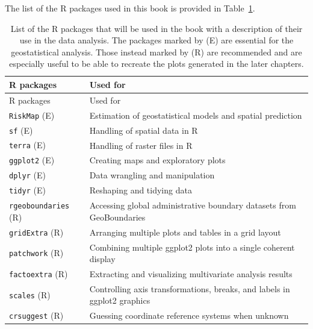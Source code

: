\documentclass[
  letterpaper,
]{krantz}
\begin{document}
The list of the R packages used in this book is provided in
Table~\ref{tbl-packages}.

\begin{longtable}[]{@{}
  >{\raggedright\arraybackslash}p{}
  >{\raggedright\arraybackslash}p{}@{}}
\caption{List of the R packages that will be used in the book with a
description of their use in the data analysis. The packages marked by
(E) are essential for the geostatistical analysis. Those instead marked
by (R) are recommended and are especially useful to be able to recreate
the plots generated in the later
chapters.}\label{tbl-packages}\tabularnewline
\toprule\noalign{}
\begin{minipage}[b]{\linewidth}\raggedright
R packages
\end{minipage} & \begin{minipage}[b]{\linewidth}\raggedright
Used for
\end{minipage} \\
\midrule\noalign{}
\endfirsthead
\toprule\noalign{}
\begin{minipage}[b]{\linewidth}\raggedright
R packages
\end{minipage} & \begin{minipage}[b]{\linewidth}\raggedright
Used for
\end{minipage} \\
\midrule\noalign{}
\endhead
\bottomrule\noalign{}
\endlastfoot
\texttt{RiskMap} (E) & Estimation of geostatistical models and spatial
prediction \\
\texttt{sf} (E) & Handling of spatial data in R \\
\texttt{terra} (E) & Handling of raster files in R \\
\texttt{ggplot2} (E) & Creating maps and exploratory plots \\
\texttt{dplyr} (E) & Data wrangling and manipulation \\
\texttt{tidyr} (E) & Reshaping and tidying data \\
\texttt{rgeoboundaries} (R) & Accessing global administrative boundary
datasets from GeoBoundaries \\
\texttt{gridExtra} (R) & Arranging multiple plots and tables in a grid
layout \\
\texttt{patchwork} (R) & Combining multiple ggplot2 plots into a single
coherent display \\
\texttt{factoextra} (R) & Extracting and visualizing multivariate
analysis results \\
\texttt{scales} (R) & Controlling axis transformations, breaks, and
labels in ggplot2 graphics \\
\texttt{crsuggest} (R) & Guessing coordinate reference systems when
unknown \\
\end{longtable}
\end{document}
